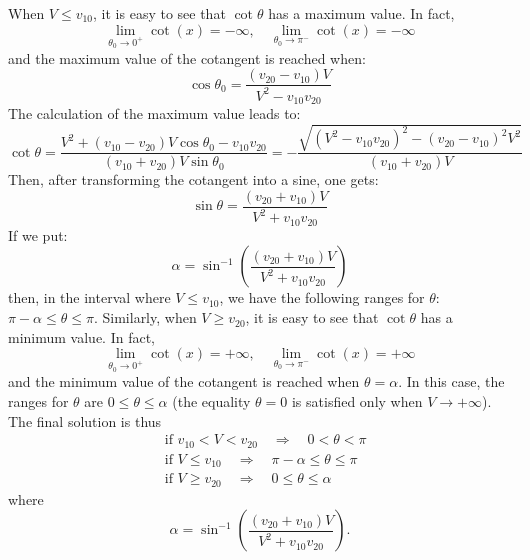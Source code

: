 \begin{problem}
{When $ V \leq v_{10} $, it is easy to see that $ \cot{\theta} $ has a maximum value. In fact,
\begin{equation*}
    \lim_{\theta_0 \to 0^+} \cot(x) = -\infty, \quad \lim_{\theta_0 \to \pi^-} \cot(x) = -\infty
\end{equation*}
and the maximum value of the cotangent is reached when:
\begin{equation*}
    \cos{\theta_0} = \frac{(v_{20} - v_{10})V}{V^2 - v_{10}v_{20}}
\end{equation*}
The calculation of the maximum value leads to:
\begin{equation*}
    \cot{\theta} = \frac{V^2 + (v_{10} - v_{20})V\cos{\theta_0} - v_{10}v_{20}}{(v_{10}+v_{20})V \sin{\theta_0}} = - \frac{\sqrt{(V^2 - v_{10}v_{20})^2 - (v_{20} - v_{10})^2 V^2}}{(v_{10} + v_{20})V}
\end{equation*}
Then, after transforming the cotangent into a sine, one gets:
\begin{equation*}
    \sin{\theta} = \frac{(v_{20} + v_{10})V}{V^2 + v_{10}v_{20}}
\end{equation*}
If we put:
\begin{equation*}
    \alpha = \sin^{-1}\left( \frac{(v_{20} + v_{10})V}{V^2 + v_{10}v_{20}} \right)
\end{equation*}
then, in the interval where $ V \leq v_{10} $, we have the following ranges for $ \theta $: $ \pi - \alpha \leq \theta \leq \pi $.
Similarly, when $ V \geq v_{20} $, it is easy to see that $ \cot{\theta} $ has a minimum value. In fact,
\begin{equation*}
    \lim_{\theta_0 \to 0^+} \cot(x) = +\infty, \quad \lim_{\theta_0 \to \pi^-} \cot(x) = +\infty
\end{equation*}
and the minimum value of the cotangent is reached when $ \theta = \alpha $. In this case, the ranges for $ \theta $ are $ 0 \leq \theta \leq \alpha $ (the equality $ \theta = 0 $ is satisfied only when $ V \to +\infty $). The final solution is thus
}
{
\begin{align*}
    &\text{if } v_{10} < V < v_{20} \quad \Rightarrow \quad 0 < \theta < \pi \\
    &\text{if } V \leq v_{10} \quad \Rightarrow \quad \pi - \alpha \leq \theta \leq \pi \\
    &\text{if } V \geq v_{20} \quad \Rightarrow \quad 0 \leq \theta \leq \alpha
\end{align*}
where
\begin{equation*}
\alpha = \sin^{-1} \left( \frac{(v_{20} + v_{10})V}{V^2 + v_{10}v_{20}} \right).
\end{equation*}
}
\end{problem}